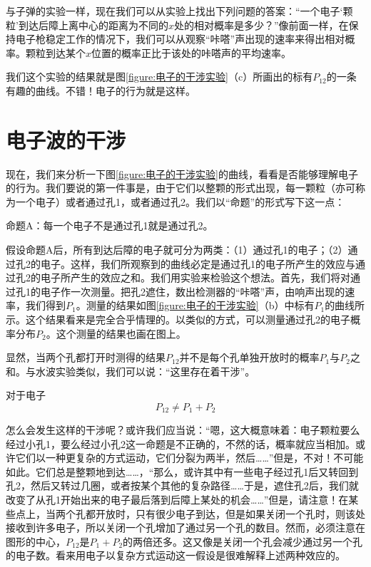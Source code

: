 与子弹的实验一样，现在我们可以从实验上找出下列问题的答案：“一个电子‘颗粒’到达后障上离中心的距离为不同的$x$处的相对概率是多少？”像前面一样，在保持电子枪稳定工作的情况下，我们可以从观察“咔嗒”声出现的速率来得出相对概率。颗粒到达某个$x$位置的概率正比于该处的咔嗒声的平均速率。

我们这个实验的结果就是图\ref{figure:电子的干涉实验}（c）所画出的标有$P_{12}$的一条有趣的曲线。不错！电子的行为就是这样。

\section{电子波的干涉}

现在，我们来分析一下图\ref{figure:电子的干涉实验}的曲线，看看是否能够理解电子的行为。我们要说的第一件事是，由于它们以整颗的形式出现，每一颗粒（亦可称为一个电子）或者通过孔1，或者通过孔2。我们以“命题”的形式写下这一点：

命题A：每一个电子不是通过孔1就是通过孔2。

假设命题A后，所有到达后障的电子就可分为两类：（1）通过孔1的电子；（2）通过孔2的电子。这样，我们所观察到的曲线必定是通过孔1的电子所产生的效应与通过孔2的电子所产生的效应之和。我们用实验来检验这个想法。首先，我们将对通过孔1的电子作一次测量。把孔2遮住，数出检测器的“咔嗒”声，由响声出现的速率，我们得到$P_1$。测量的结果如图\ref{figure:电子的干涉实验}（b）中标有$P_1$的曲线所示。这个结果看来是完全合乎情理的。以类似的方式，可以测量通过孔2的电子概率分布$P_2$。这个测量的结果也画在图上。

显然，当两个孔都打开时测得的结果$P_{12}$并不是每个孔单独开放时的概率$P_1$与$P_2$之和。与水波实验类似，我们可以说：“这里存在着干涉”。

对于电子
\begin{equation}
    \label{Eq:I:37:5}
    P_{12} \neq P_1 + P_2
\end{equation}

怎么会发生这样的干涉呢？或许我们应当说：“嗯，这大概意味着：电子颗粒要么经过小孔1，要么经过小孔2这一命题是不正确的，不然的话，概率就应当相加。或许它们以一种更复杂的方式运动，它们分裂为两半，然后……”但是，不对！不可能如此。它们总是整颗地到达……，“那么，或许其中有一些电子经过孔1后又转回到孔2，然后又转过几圈，或者按某个其他的复杂路径……于是，遮住孔2后，我们就改变了从孔1开始出来的电子最后落到后障上某处的机会……”但是，请注意！在某些点上，当两个孔都开放时，只有很少电子到达，但是如果关闭一个孔时，则该处接收到许多电子，所以关闭一个孔增加了通过另一个孔的数目。然而，必须注意在图形的中心，$P_{12}$是$P_1+P_2$的两倍还多。这又像是关闭一个孔会减少通过另一个孔的电子数。看来用电子以复杂方式运动这一假设是很难解释上述两种效应的。

